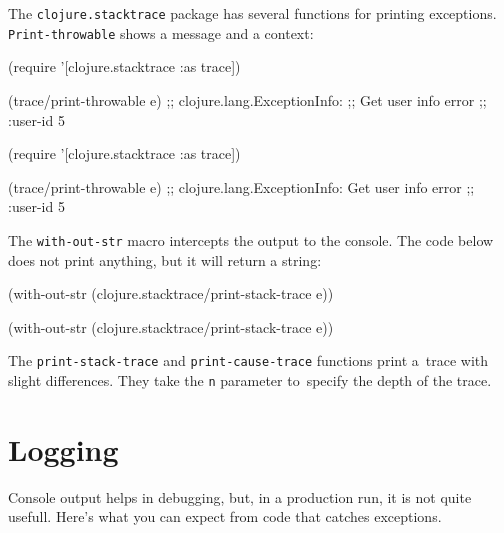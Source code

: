 
The \verb|clojure.stacktrace| package has several functions for printing exceptions. \verb|Print-throwable| shows a message and a context:

\ifnarrow

\begin{english}
  \begin{clojure}
(require '[clojure.stacktrace :as trace])

(trace/print-throwable e)
;; clojure.lang.ExceptionInfo:
;; Get user info error
;; {:user-id 5}
  \end{clojure}
\end{english}

\else

\begin{english}
  \begin{clojure}
(require '[clojure.stacktrace :as trace])

(trace/print-throwable e)
;; clojure.lang.ExceptionInfo: Get user info error
;; {:user-id 5}
  \end{clojure}
\end{english}

\fi

The \verb|with-out-str| macro intercepts the output to the console. The code below does not print anything, but it will return a string:

\ifnarrow

\begin{clojure}
(with-out-str
  (clojure.stacktrace/print-stack-trace
    e))
\end{clojure}

\else

\begin{clojure}
(with-out-str
  (clojure.stacktrace/print-stack-trace e))
\end{clojure}

\fi

The \texttt{print\--stack\--trace} and \texttt{print\--cause\--trace} functions
print a~trace with slight differences. They take the \verb|n| parameter
to~specify the depth of the trace.

\section{Logging}


Console output helps in debugging, but, in a production run, it is not quite usefull. Here's what you can expect from code that catches exceptions.

